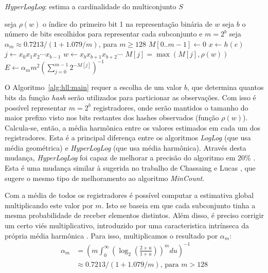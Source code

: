 \begin{algorithm}
\linespread{1}\selectfont
\caption{\emph{HyperLogLog}: estima a cardinalidade do multiconjunto $S$}
\label{alg:hll:main}
\begin{algorithmic}[1]
\State seja $\rho(w)$ o índice do primeiro bit 1 na representação binária de $w$
\State seja $b$ o número de bits escolhidos para representar cada subconjunto e $m=2^b$
\State seja $\alpha_m \approx 0.7213/(1 + 1.079/m)$, para $m \geq 128$
    \State $M[0..m-1] \gets 0$
        \State $x \gets h(e)$
        \State $j \gets x_0x_1x_2 \cdots x_{b-1}$
        \State $w \gets x_b x_{b+1}x_{b+2} \cdots$
        \State $M[j] = \max(M[j], \rho(w))$
    \EndFor
    \State $E \gets \alpha_m m^2 \left(\sum_{j=0}^{m-1} 2^{-M[j]}\right)^{-1}$
	  
	  
    \Else{ }
    \EndIf
\EndFunction
\end{algorithmic}
\end{algorithm}

O Algoritmo~\ref{alg:hll:main} requer a escolha de um valor $b$, que determina quantos bits da função \emph{hash} serão utilizados para particionar as observações. Com isso é possível representar $m=2^b$ registradores, onde serão mantidos o tamanho do maior prefixo visto nos bits restantes dos hashes observados (função $\rho(w)$). Calcula-se, então, a média harmônica entre os valores estimados em cada um dos registradores. Esta é a principal diferença entre os algoritmos \emph{LogLog} (que usa média geométrica) e \emph{HyperLogLog} (que usa média harmônica). Através desta mudança, \emph{HyperLogLog} foi capaz de melhorar a precisão do algoritmo em 20\%  \cite{flajolet2008hyperloglog}. Esta é uma mudança similar à sugerida no trabalho de Chassaing e Lucas \cite{chassaing2007efficient}, que sugere o mesmo tipo de melhoramento ao algoritmo \emph{MinCount}.

Com a média de todos os registradores é possível computar a estimativa global multiplicando este valor por $m$. Isto se baseia em que cada subconjunto tinha a mesma probabilidade de receber elementos distintos. Além disso, é preciso corrigir um certo viés multiplicativo, introduzido por uma caracteristica intrínseca da própria média harmônica \cite{flajolet2008hyperloglog}. Para isso, multiplicamos o resultado por $\alpha_m$:
\begin{align*}
    \alpha_m & = \left( m \int_0^\infty \left( \log_2 \left( \frac{2+u}{1+u} \right) \right)^m du \right) ^ {-1} \\
             & \approx  0.7213/(1+ 1.079/m) \text{, para } m>128
\end{align*}

